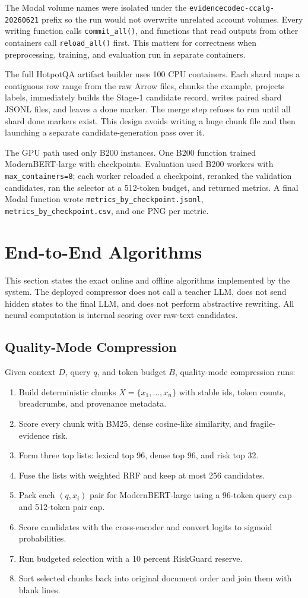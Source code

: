 \documentclass[10pt,twocolumn]{article}
\begin{document}
The Modal volume names were isolated under the \texttt{evidencecodec-ccalg-20260621} prefix so the run would not overwrite unrelated account volumes. Every writing function calls \texttt{commit\_all()}, and functions that read outputs from other containers call \texttt{reload\_all()} first. This matters for correctness when preprocessing, training, and evaluation run in separate containers.

The full HotpotQA artifact builder uses 100 CPU containers. Each shard maps a contiguous row range from the raw Arrow files, chunks the example, projects labels, immediately builds the Stage-1 candidate record, writes paired shard JSONL files, and leaves a done marker. The merge step refuses to run until all shard done markers exist. This design avoids writing a huge chunk file and then launching a separate candidate-generation pass over it.

The GPU path used only B200 instances. One B200 function trained ModernBERT-large with checkpoints. Evaluation used B200 workers with \texttt{max\_containers=8}; each worker reloaded a checkpoint, reranked the validation candidates, ran the selector at a 512-token budget, and returned metrics. A final Modal function wrote \texttt{metrics\_by\_checkpoint.jsonl}, \texttt{metrics\_by\_checkpoint.csv}, and one PNG per metric.

\section{End-to-End Algorithms}
This section states the exact online and offline algorithms implemented by the system. The deployed compressor does not call a teacher LLM, does not send hidden states to the final LLM, and does not perform abstractive rewriting. All neural computation is internal scoring over raw-text candidates.

\subsection{Quality-Mode Compression}
Given context $D$, query $q$, and token budget $B$, quality-mode compression runs:
\begin{enumerate}
\item Build deterministic chunks $X=\{x_1,\ldots,x_n\}$ with stable ids, token counts, breadcrumbs, and provenance metadata.
\item Score every chunk with BM25, dense cosine-like similarity, and fragile-evidence risk.
\item Form three top lists: lexical top 96, dense top 96, and risk top 32.
\item Fuse the lists with weighted RRF and keep at most 256 candidates.
\item Pack each $(q,x_i)$ pair for ModernBERT-large using a 96-token query cap and 512-token pair cap.
\item Score candidates with the cross-encoder and convert logits to sigmoid probabilities.
\item Run budgeted selection with a 10 percent RiskGuard reserve.
\item Sort selected chunks back into original document order and join them with blank lines.
\end{enumerate}
\end{document}
